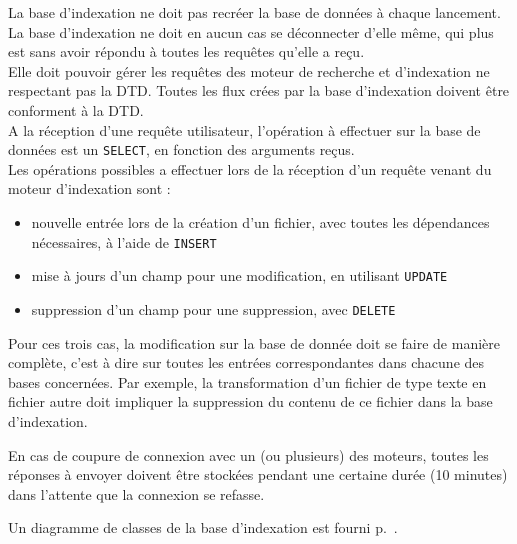 La base d'indexation ne doit pas recréer la base de données à chaque lancement.\\
La base d'indexation ne doit en aucun cas se déconnecter d'elle même, qui plus est sans avoir répondu à toutes les requêtes qu'elle a reçu.\\
Elle doit pouvoir gérer les requêtes des moteur de recherche et d'indexation ne respectant pas la DTD. Toutes les flux crées par la base d'indexation doivent être conforment à la DTD.\\
A la réception d'une requête utilisateur, l'opération à effectuer sur la base de données est un \verb"SELECT", en fonction des arguments reçus.\\
Les opérations possibles a effectuer lors de la réception d'un requête venant du moteur d'indexation sont :
\begin{itemize}
\item nouvelle entrée lors de la création d'un fichier, avec toutes les dépendances nécessaires, à l'aide de \verb"INSERT"
\item mise à jours d'un champ pour une modification, en utilisant \verb"UPDATE"
\item suppression d'un champ pour une suppression, avec \verb"DELETE"
\end{itemize}
Pour ces trois cas, la modification sur la base de donnée doit se faire de manière complète, c'est à dire sur toutes les entrées correspondantes dans chacune des bases concernées. Par exemple, la transformation d'un fichier de type texte en fichier autre doit impliquer la suppression du contenu de ce fichier dans la base d'indexation.

En cas de coupure de connexion avec un (ou plusieurs) des moteurs, toutes les réponses à envoyer doivent être stockées pendant une certaine durée (10 minutes) dans l'attente que la connexion se refasse.

Un diagramme de classes de la base d'indexation est fourni p.~\pageref{diagramme_classes_bi}.